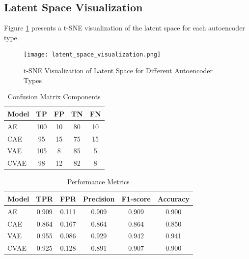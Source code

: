 \subsection{Latent Space Visualization}

Figure \ref{fig:latent_space} presents a t-SNE visualization of the latent space for each autoencoder type.

\begin{figure}[htbp]
    \centering
    \texttt{[image: latent\_space\_visualization.png]}
    \caption{t-SNE Visualization of Latent Space for Different Autoencoder Types}
    \label{fig:latent_space}
\end{figure}

\begin{table}[h]
\centering
\begin{tabular}{lSSSS}
\toprule
Model & {TP} & {FP} & {TN} & {FN} \\
\midrule
AE  & 100 & 10 & 80 & 10 \\
CAE  & 95 & 15 & 75 & 15 \\
VAE  & 105 & 8 & 85 & 5 \\
CVAE & 98 & 12 & 82 & 8 \\
\bottomrule
\end{tabular}
\caption{Confusion Matrix Components}
\end{table}

\begin{table}[h]
\centering
\begin{tabular}{lSSSSS}
\toprule
Model & {TPR} & {FPR} & {Precision} & {F1-score} & {Accuracy} \\
\midrule
AE & 0.909 & 0.111 & 0.909 & 0.909 & 0.900 \\
CAE & 0.864 & 0.167 & 0.864 & 0.864 & 0.850 \\
VAE  & 0.955 & 0.086 & 0.929 & 0.942 & 0.941 \\
CVAE & 0.925 & 0.128 & 0.891 & 0.907 & 0.900 \\
\bottomrule
\end{tabular}
\caption{Performance Metrics}
\end{table}


